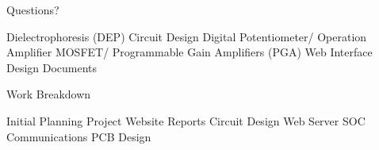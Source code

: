 \begin{frame}{Questions?}
  \begin{enumerate}
    Dielectrophoresis (DEP)
    Circuit Design
    Digital Potentiometer/ Operation Amplifier
    MOSFET/ Programmable Gain Amplifiers (PGA)
    Web Interface
    Design Documents
  \end{enumerate}
\end{frame}

\begin{frame}{Work Breakdown}
  \begin{enumerate}
    Initial Planning
    Project Website
    Reports
    Circuit Design
    Web Server
    SOC Communications
    PCB Design
  \end{enumerate}
\end{frame}

